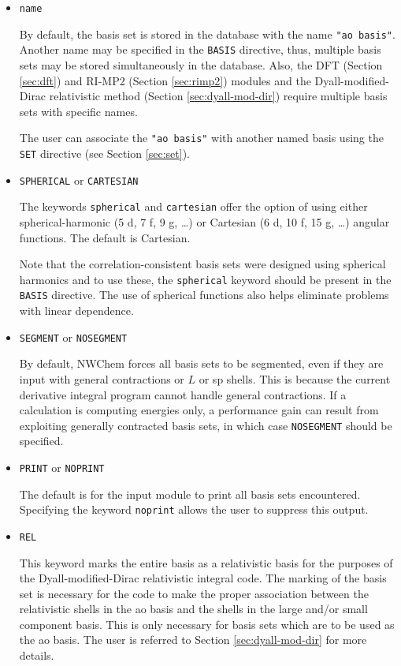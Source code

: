 \begin{itemize}
\item {\tt name}

  By default, the basis set is stored in the database with the name
  \verb+"ao basis"+.  Another name may be specified in the \verb+BASIS+
  directive, thus, multiple basis sets may be stored simultaneously in the
  database.  Also, the DFT (Section \ref{sec:dft}) 
  and RI-MP2 (Section \ref{sec:rimp2}) modules and the
  Dyall-modified-Dirac relativistic method (Section \ref{sec:dyall-mod-dir})
  require multiple basis sets with specific names.

The user can associate the \verb+"ao basis"+ with another named basis
using the \verb+SET+ directive (see Section \ref{sec:set}).  

\item {{\tt SPHERICAL} or {\tt CARTESIAN}}

The keywords \verb+spherical+ and \verb+cartesian+ offer the option of
using either spherical-harmonic (5 d, 7 f, 9 g, \ldots) or Cartesian
(6 d, 10 f, 15 g, \ldots) angular functions.  The default is
Cartesian.  

Note that the correlation-consistent basis sets were designed using
spherical harmonics and to use these, the \verb+spherical+ keyword
should be present in the \verb+BASIS+ directive.  The use of spherical
functions also helps eliminate problems with linear dependence.


\item {{\tt SEGMENT} or {\tt NOSEGMENT}}

By default, NWChem forces all basis sets to be segmented, 
even if they are input with general contractions or $L$ or sp
shells. This is because the current derivative integral program cannot
handle general contractions.  If a calculation is  
computing energies only, a 
performance gain can result from exploiting generally contracted basis
sets, in which case {\tt NOSEGMENT} should be specified.

\item {{\tt PRINT} or {\tt NOPRINT}}

The default is for the input module to print all basis sets encountered.
Specifying the keyword \verb+noprint+ allows the user to suppress this output.

\item {{\tt REL}}

This keyword marks the entire basis as a relativistic basis for the purposes
of the Dyall-modified-Dirac relativistic integral code. The marking of the
basis set is necessary for the code to make the proper association between
the relativistic shells in the ao basis and the shells in the large and/or
small component basis. This is only necessary for basis sets which are to be
used as the ao basis. The user is referred to Section \ref{sec:dyall-mod-dir}  
for more details.

\end{itemize}

